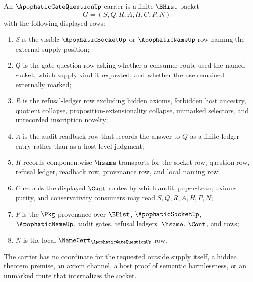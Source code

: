 \begin{definition}
\label{def:apophatic-gate-question-carrier}
An $\ApophaticGateQuestionUp$ carrier is a finite $\BHist$ packet
$$
G=(S,Q,R,A,H,C,P,N)
$$
with the following displayed rows:
\begin{enumerate}
\item $S$ is the visible $\ApophaticSocketUp$ or $\ApophaticNameUp$ row naming the external supply position;
\item $Q$ is the gate-question row asking whether a consumer route used the named socket, which supply kind it requested, and whether the use remained externally marked;
\item $R$ is the refusal-ledger row excluding hidden axioms, forbidden host ancestry, quotient collapse, proposition-extensionality collapse, unmarked selectors, and unrecorded inscription novelty;
\item $A$ is the audit-readback row that records the answer to $Q$ as a finite ledger entry rather than as a host-level judgment;
\item $H$ records componentwise $\hsame$ transports for the socket row, question row, refusal ledger, readback row, provenance row, and local naming row;
\item $C$ records the displayed $\Cont$ routes by which audit, paper-Lean, axiom-purity, and conservativity consumers may read $S,Q,R,A,H,P,N$;
\item $P$ is the $\Pkg$ provenance over $\BHist$, $\ApophaticSocketUp$, $\ApophaticNameUp$, audit gates, refusal ledgers, $\hsame$, $\Cont$, and \NameCert{} rows;
\item $N$ is the local $\NameCert_{\ApophaticGateQuestionUp}$ row.
\end{enumerate}
The carrier has no coordinate for the requested outside supply itself, a hidden theorem premise, an axiom channel, a host proof of semantic harmlessness, or an unmarked route that internalizes the socket.
\end{definition}

